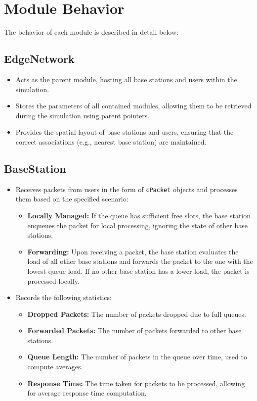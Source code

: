 \documentclass{report}
\begin{document}
\section{Module Behavior}

The behavior of each module is described in detail below:

\subsection{EdgeNetwork}
\begin{itemize}
    \item Acts as the parent module, hosting all base stations and users within the simulation.
    \item Stores the parameters of all contained modules, allowing them to be retrieved during the simulation using parent pointers.
    \item Provides the spatial layout of base stations and users, ensuring that the correct associations (e.g., nearest base station) are maintained.
\end{itemize}

\subsection{BaseStation}
\begin{itemize}
    \item Receives packets from users in the form of \texttt{cPacket} objects and processes them based on the specified scenario:
    \begin{itemize}
        \item \textbf{Locally Managed:} If the queue has sufficient free slots, the base station enqueues the packet for local processing, ignoring the state of other base stations.
        \item \textbf{Forwarding:} Upon receiving a packet, the base station evaluates the load of all other base stations and forwards the packet to the one with the lowest queue load. If no other base station has a lower load, the packet is processed locally.
    \end{itemize}
    \item Records the following statistics:
    \begin{itemize}
        \item \textbf{Dropped Packets:} The number of packets dropped due to full queues.
        \item \textbf{Forwarded Packets:} The number of packets forwarded to other base stations.
        \item \textbf{Queue Length:} The number of packets in the queue over time, used to compute averages.
        \item \textbf{Response Time:} The time taken for packets to be processed, allowing for average response time computation.
    \end{itemize}
\end{itemize}
\end{document}
